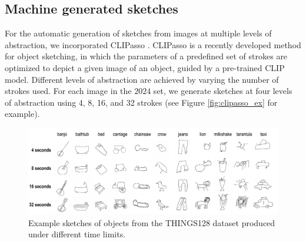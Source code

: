 \documentclass[10pt,letterpaper]{article}
\begin{document}
\subsection{Machine generated sketches}
For the automatic generation of sketches from images at multiple levels of abstraction, we incorporated CLIPasso \cite{vinker2022clipasso}.
CLIPasso is a recently developed method for object sketching, in which the parameters of a predefined set of strokes are optimized to depict a given image of an object, guided by a pre-trained CLIP \cite{radford2021learning} model.
Different levels of abstraction are achieved by varying the number of strokes used. 
For each image in the $2024$ set, we generate sketches at four levels of abstraction using 4, 8, 16, and 32 strokes (see Figure \ref{fig:clipasso_ex} for example).



\begin{figure}
    \centering
    \includegraphics[width= 1\linewidth]{figures/thingsdraw_gallery_alpha.pdf}
    \caption{Example sketches of objects from the THINGS128 dataset produced under different time limits.}
    \label{fig:gallery}
\end{figure}
\end{document}
